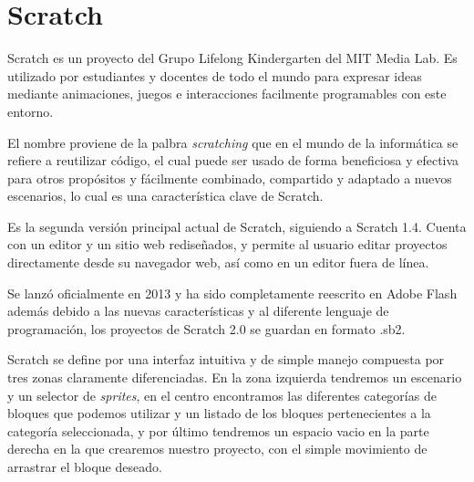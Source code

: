 \section{Scratch}
\label{sec:scratch}

Scratch es un proyecto del Grupo Lifelong Kindergarten del MIT Media Lab.
Es utilizado por estudiantes y docentes de todo el mundo para expresar ideas mediante animaciones, juegos e interacciones facilmente programables con este entorno.

El nombre proviene de la palbra \textit{scratching} que en el mundo de la informática se refiere a reutilizar código, el cual puede ser usado de forma beneficiosa y efectiva para otros propósitos y fácilmente combinado, compartido y adaptado a nuevos escenarios, lo cual es una característica clave de Scratch.

Es la segunda versión principal actual de Scratch, siguiendo a Scratch 1.4. Cuenta con un editor y un sitio web rediseñados, y permite al usuario editar proyectos directamente desde su navegador web, así como en un editor fuera de línea.

Se lanzó oficialmente en 2013 y ha sido completamente reescrito en Adobe Flash además debido a las nuevas características y al diferente lenguaje de programación, los proyectos de Scratch 2.0 se guardan en formato .sb2.

Scratch se define por una interfaz intuitiva y de simple manejo compuesta por tres zonas claramente diferenciadas. En la zona izquierda tendremos un escenario y un selector de \textit{sprites}, en el centro encontramos las diferentes categorías de bloques que podemos utilizar y un listado de los bloques pertenecientes a la categoría seleccionada, y por último tendremos un espacio vacio en la parte derecha en la que crearemos nuestro proyecto, con el simple movimiento de arrastrar el bloque deseado.

